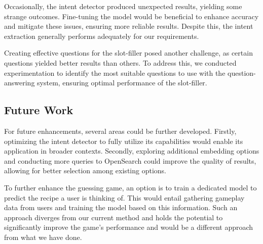 \documentclass[runningheads]{llncs}
\begin{document}
Occasionally, the intent detector produced unexpected results, yielding some strange outcomes. Fine-tuning the model would be beneficial to enhance accuracy and mitigate these issues, ensuring more reliable results. Despite this, the intent extraction generally performs adequately for our requirements.

Creating effective questions for the slot-filler posed another challenge, as certain questions yielded better results than others. To address this, we conducted experimentation to identify the most suitable questions to use with the question-answering system, ensuring optimal performance of the slot-filler.

\subsection{Future Work}
For future enhancements, several areas could be further developed. Firstly, optimizing the intent detector to fully utilize its capabilities would enable its application in broader contexts. Secondly, exploring additional embedding options and conducting more queries to OpenSearch could improve the quality of results, allowing for better selection among existing options.

To further enhance the guessing game, an option is to train a dedicated model to predict the recipe a user is thinking of. This would entail gathering gameplay data from users and training the model based on this information. Such an approach diverges from our current method and holds the potential to significantly improve the game's performance and would be a different approach from what we have done.



\end{document}
